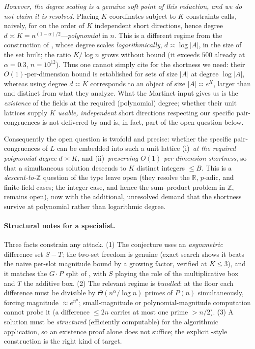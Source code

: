 \documentclass[11pt]{article}
\theoremstyle{definition}
\newcommand{\Z}{\mathbb{Z}}
\newcommand{\R}{\mathbb{R}}
\begin{document}
\emph{However, the degree scaling is a genuine soft point of this reduction, and we
do not claim it is resolved.} Placing $K$ coordinates subject to $K$ constraints
calls, naively, for on the order of $K$ independent short directions, hence degree
$d\asymp K=n^{(1-\alpha)/2}$---\emph{polynomial} in $n$. This is a different regime
from the construction of \cite{BSSZ}, whose degree scales \emph{logarithmically},
$d\asymp\log|A|$, in the size of the set built; the ratio $K/\log n$ grows without
bound (it exceeds $500$ already at $\alpha=0.3$, $n=10^{12}$). Thus one cannot
simply cite \cite{BSSZ} for the shortness we need: their $O(1)$-per-dimension bound
is established for sets of size $|A|$ at degree $\log|A|$, whereas using degree
$d\asymp K$ corresponds to an object of size $|A|\asymp e^{K}$, larger than and
distinct from what they analyze. What the Martinet input gives us is the
\emph{existence} of the fields at the required (polynomial) degree; whether their
unit lattices supply $K$ \emph{usable, independent} short directions respecting our
specific pair-congruences is not delivered by \cite{BSSZ} and is, in fact, part of
the open question below.

Consequently the open question is twofold and precise: whether the specific
pair-congruences of $L$ can be embedded into such a unit lattice
(i)~\emph{at the required polynomial degree} $d\asymp K$, and (ii)~\emph{preserving
$O(1)$-per-dimension shortness}, so that a simultaneous solution descends to $K$
distinct integers $\le B$. This is a \emph{descent-to-$\Z$} question of the type
\cite{BSSZ} leave open (they resolve the $\R$, $p$-adic, and finite-field cases;
the integer case, and hence the sum--product problem in $\Z$, remains open), now
with the additional, unresolved demand that the shortness survive at polynomial
rather than logarithmic degree.

\paragraph{Structural notes for a specialist.}
Three facts constrain any attack.
(1) The conjecture uses an \emph{asymmetric} difference set $S-T$; the two-set
freedom is genuine (exact search shows it beats the naive per-slot magnitude bound
by a growing factor, verified at $K\le 3$), and it matches the $G\cdot P$ split of
\cite{BSSZ}, with $S$ playing the role of the multiplicative box and $T$ the
additive box. (2) The relevant regime is \emph{bundled}: at the floor each
difference must be divisible by $\Theta(n^{\alpha}/\log n)$ primes of $P(n)$
simultaneously, forcing magnitude $\approx e^{n^{\alpha}}$; small-magnitude or
polynomial-magnitude computation cannot probe it (a difference $\le 2n$ carries at
most one prime $>n/2$). (3) A solution must be \emph{structured} (efficiently
computable) for the algorithmic application, so an existence proof alone does not
suffice; the explicit \cite{BSSZ}-style construction is the right kind of target.
\end{document}
